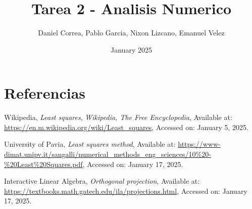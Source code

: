 \documentclass{article}
\title{Tarea 2 - Analisis Numerico}
\author{Daniel Correa, Pablo Garcia, Nixon Lizcano, Emanuel Velez}
\date{January 2025}
\begin{document}
\maketitle







\section{Referencias}
\begingroup
\renewcommand{\section}[2]{}
\begin{thebibliography}{0}
\setlength{\parskip}{0mm}
\setlength{\itemsep}{-0.3mm}
\small

 Wikipedia, \textit{Least squares}, 
\textit{Wikipedia, The Free Encyclopedia}, 
Available at: \url{https://en.m.wikipedia.org/wiki/Least_squares}, 
Accessed on: January 5, 2025.

 University of Pavia, \textit{Least squares method}, 
\textit{}
Available at: \url{https://www-dimat.unipv.it/sangalli/numerical_methods_eng_sciences/10%20-%20Least%20Squares.pdf}, 
Accessed on: January 17, 2025.

 Interactive Linear Algebra, \textit{Orthogonal projection}, 
\textit{}
Available at: \url{https://textbooks.math.gatech.edu/ila/projections.html}, 
Accessed on: January 17, 2025.


\end{thebibliography}
\endgroup
\end{document}
